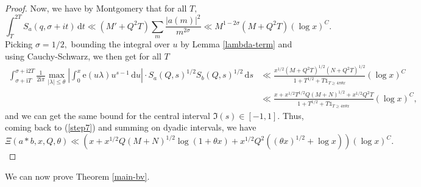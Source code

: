 \documentclass{article}
\newcommand{\e}{\mathrm{e}}
\newcommand{\de}{\,\mathrm{d}}
\newcommand{\ii}{\mathrm{i}}
\newcommand{\Ind}{\mathbb{1}}
\begin{document}
\begin{proof}
    Now, we have by Montgomery \cite[Theorem 7.1]{montgomery} that for all $T,$ $$\int_T^{2T} S_a(q,\sigma + it) \de t \ll (M' + Q^2T) \sum_m \frac{|a(m)|^2}{m^{2\sigma}} \ll M^{1-2\sigma}(M + Q^2T)(\log x)^C.$$ 
    Picking $\sigma = 1/2,$ bounding the integral over $u$ by Lemma \ref{lambda-term} and using Cauchy-Schwarz, we then get for all $T$
    \begin{align*}
        \int_{\sigma + \ii T}^{\sigma + \ii 2T} \frac{1}{2\ii\pi} \max_{|\lambda|\le\theta} \left|\int_0^x \e(u\lambda) u^{s-1} \de u\right| \cdot S_a(Q,s)^{1/2} S_b(Q,s)^{1/2} \de s &\ll \frac{x^{1/2} (M + Q^2T)^{1/2} (N + Q^2T)^{1/2}}{1+ T^{1/2} + T\Ind_{T\ge 4\pi\theta x}}(\log x)^C
        \\&\ll \frac{x + x^{1/2}T^{1/2}Q(M+N)^{1/2} + x^{1/2}Q^2T}{1+ T^{1/2} + T\Ind_{T\ge 4\pi\theta x}}(\log x)^C,
    \end{align*}
    and we can get the same bound for the central interval $\Im(s) \in [-1,1].$ Thus, coming back to (\ref{step7}) and summing on dyadic intervals, we have 
    $$\Xi(a * b, x, Q, \theta) \ll \left(x + x^{1/2}Q(M+N)^{1/2}\log(1+\theta x) + x^{1/2}Q^2\left((\theta x)^{1/2} + \log x\right)\right)(\log x)^C.$$
\end{proof}

We can now prove Theorem \ref{main-bv}.
\end{document}
